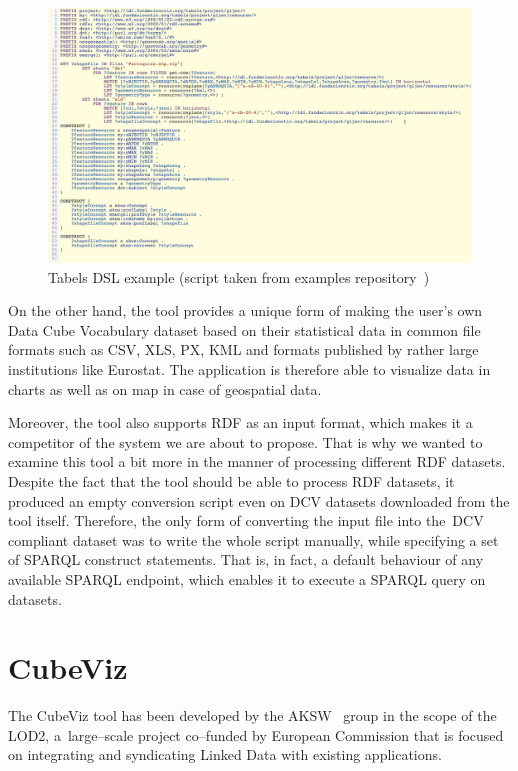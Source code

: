 \begin{figure}
	\centering
	\includegraphics[width=140mm]{img/tabels.png}
	\caption{Tabels DSL example (script taken from examples repository~\cite{tabels-web})}
	\label{fig:tabels}
\end{figure}

On the other hand, the tool provides a unique form of making the user's own Data Cube 
Vocabulary dataset based on their statistical data in common file formats such as 
CSV, XLS, PX, KML and formats published by rather large institutions like Eurostat. 
The application is therefore able to visualize data in charts as well as on map 
in case of geospatial data.

Moreover, the tool also supports RDF as an input format, which makes it a 
competitor of the system we are about to propose. That is why we wanted
to examine this tool a bit more in the manner of processing different RDF 
datasets. Despite the fact that the tool should be able to process RDF 
datasets, it produced an empty conversion script even on DCV datasets downloaded 
from the tool itself. Therefore, the only form of converting the input file into 
the~DCV compliant dataset was to write the whole script manually, while 
specifying a set of SPARQL construct statements. That is, in fact, a default 
behaviour of any available SPARQL endpoint, which enables it to execute a SPARQL 
query on datasets.

\section{CubeViz}
\label{cubeviz}
The CubeViz tool has been developed by the AKSW~\cite{aksw} group
in the scope of the LOD2,
a~large--scale project co--funded by European Commission that is
focused on integrating and syndicating Linked Data with existing applications.

